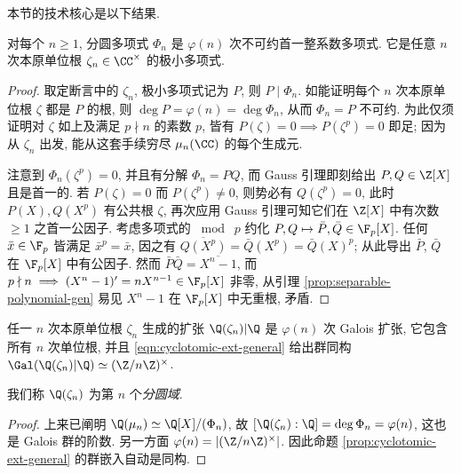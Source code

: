 本节的技术核心是以下结果.
\begin{theorem}
	对每个 $n \geq 1$, 分圆多项式 $\Phi_n$ 是 $\varphi(n)$ 次不可约首一整系数多项式. 它是任意 $n$ 次本原单位根 $\zeta_n \in \CC^\times$ 的极小多项式.
\end{theorem}
\begin{proof}
	取定断言中的 $\zeta_n$, 极小多项式记为 $P$, 则 $P \mid \Phi_n$. 如能证明每个 $n$ 次本原单位根 $\zeta$ 都是 $P$ 的根, 则 $\deg P = \varphi(n) = \deg \Phi_n$, 从而 $\Phi_n = P$ 不可约. 为此仅须证明对 $\zeta$ 如上及满足 $p \nmid n$ 的素数 $p$, 皆有 $P(\zeta)=0 \implies P(\zeta^p)=0$ 即足; 因为从 $\zeta_n$ 出发, 能从这套手续穷尽 $\mu_n(\CC)$ 的每个生成元.
	
	注意到 $\Phi_n(\zeta^p)=0$, 并且有分解 $\Phi_n = PQ$, 而 Gauss 引理即刻给出 $P,Q \in \Z[X]$ 且是首一的. 若 $P(\zeta)=0$ 而 $P(\zeta^p) \neq 0$, 则势必有 $Q(\zeta^p)=0$, 此时 $P(X), Q(X^p)$ 有公共根 $\zeta$, 再次应用 Gauss 引理可知它们在 $\Z[X]$ 中有次数 $\geq 1$ 之首一公因子. 考虑多项式的 $\bmod \; p$ 约化 $P,Q \mapsto \bar{P},\bar{Q} \in \F_p[X]$. 任何 $\bar{x} \in \F_p$ 皆满足 $\bar{x}^p = \bar{x}$, 因之有 $\overline{Q(X^p)} = \bar{Q}(X^p) = \bar{Q}(X)^p$; 从此导出 $\bar{P}$, $\bar{Q}$ 在 $\F_p[X]$ 中有公因子. 然而 $\bar{P}\bar{Q} = \overline{X^n-1}$, 而 $p \nmid n \implies (X^n-1)' = nX^{n-1} \in \F_p[X]$ 非零, 从引理 \ref{prop:separable-polynomial-gen} 易见 $X^n-1$ 在 $\F_p[X]$ 中无重根, 矛盾.
\end{proof}

\begin{theorem}\label{prop:cyclotomic-Galois}
	任一 $n$ 次本原单位根 $\zeta_n$ 生成的扩张 $\Q(\zeta_n)|\Q$ 是 $\varphi(n)$ 次 Galois 扩张, 它包含所有 $n$ 次单位根, 并且 \eqref{eqn:cyclotomic-ext-general} 给出群同构 $\Gal(\Q(\zeta_n)|\Q) \simeq (\Z/n\Z)^\times$.
\end{theorem}
我们称 $\Q(\zeta_n)$ 为第 $n$ 个\emph{分圆域}. 
\begin{proof}
	上来已阐明 $\Q(\mu_n) \simeq \Q[X]/(\Phi_n)$, 故 $[\Q(\zeta_n) : \Q] = \deg \Phi_n = \varphi(n)$, 这也是 Galois 群的阶数. 另一方面 $\varphi(n) = |(\Z/n\Z)^\times|$. 因此命题 \ref{prop:cyclotomic-ext-general} 的群嵌入自动是同构.
\end{proof}

